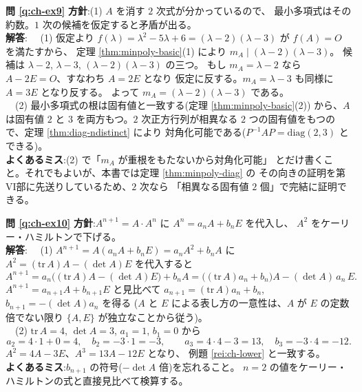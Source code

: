 \bigskip
\noindent\textbf{問 \ref{q:ch-ex9}}\quad
\textbf{方針}:(1) $A$ を消す $2$ 次式が分かっているので、
最小多項式はその約数。$1$ 次の候補を仮定すると矛盾が出る。\\
\textbf{解答}:
　(1) 仮定より $f(\lambda) = \lambda^2 - 5\lambda + 6
= (\lambda - 2)(\lambda - 3)$ が $f(A) = O$ を満たすから、
定理 \ref{thm:minpoly-basic}(1) により $m_A \mid (\lambda - 2)(\lambda - 3)$。
候補は $\lambda - 2$, $\lambda - 3$, $(\lambda - 2)(\lambda - 3)$ の三つ。
もし $m_A = \lambda - 2$ なら $A - 2E = O$、すなわち $A = 2E$ となり
仮定に反する。$m_A = \lambda - 3$ も同様に $A = 3E$ となり反する。
よって $m_A = (\lambda - 2)(\lambda - 3)$ である。\\
　(2) 最小多項式の根は固有値と一致する(定理 \ref{thm:minpoly-basic}(2))
から、$A$ は固有値 $2$ と $3$ を両方もつ。$2$ 次正方行列が相異なる
$2$ つの固有値をもつので、定理 \ref{thm:diag-ndistinct} により
対角化可能である($P^{-1}AP = \mathrm{diag}(2, 3)$ とできる)。\\
\textbf{よくあるミス}:(2) で「$m_A$ が重根をもたないから対角化可能」
とだけ書くこと。それでもよいが、本書では定理 \ref{thm:minpoly-diag} の
その向きの証明を第VI部に先送りしているため、$2$ 次なら
「相異なる固有値 $2$ 個」で完結に証明できる。

\bigskip
\noindent\textbf{問 \ref{q:ch-ex10}}\quad
\textbf{方針}:$A^{n+1} = A \cdot A^n$ に $A^n = a_nA + b_nE$ を代入し、
$A^2$ をケーリー・ハミルトンで下げる。\\
\textbf{解答}:
　(1) $A^{n+1} = A(a_nA + b_nE) = a_nA^2 + b_nA$ に
$A^2 = (\mathrm{tr}\,A)A - (\det A)E$ を代入すると
\[
A^{n+1} = a_n\bigl((\mathrm{tr}\,A)A - (\det A)E\bigr) + b_nA
= \bigl((\mathrm{tr}\,A)a_n + b_n\bigr)A - (\det A)\,a_n\,E.
\]
$A^{n+1} = a_{n+1}A + b_{n+1}E$ と見比べて
$a_{n+1} = (\mathrm{tr}\,A)a_n + b_n$,
$b_{n+1} = -(\det A)a_n$ を得る
($A$ と $E$ による表し方の一意性は、$A$ が $E$ の定数倍でない限り
$\{A, E\}$ が独立なことから従う)。\\
　(2) $\mathrm{tr}\,A = 4$, $\det A = 3$, $a_1 = 1$, $b_1 = 0$ から
\[
a_2 = 4 \cdot 1 + 0 = 4, \quad b_2 = -3 \cdot 1 = -3, \qquad
a_3 = 4 \cdot 4 - 3 = 13, \quad b_3 = -3 \cdot 4 = -12.
\]
$A^2 = 4A - 3E$、$A^3 = 13A - 12E$ となり、
例題 \ref{rei:ch-lower} と一致する。\\
\textbf{よくあるミス}:$b_{n+1}$ の符号($-\det A$ 倍)を忘れること。
$n = 2$ の値をケーリー・ハミルトンの式と直接見比べて検算する。

